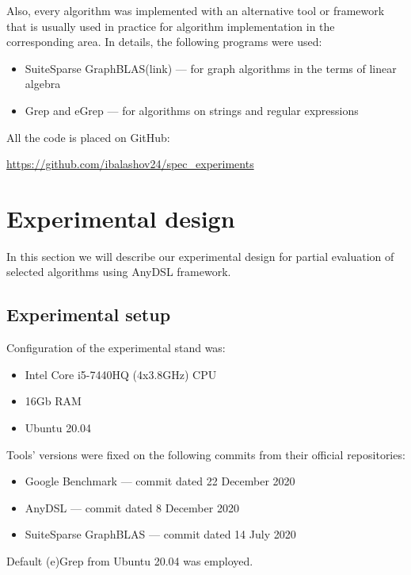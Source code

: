 \documentclass[conference]{IEEEtran}
\begin{document}
Also, every algorithm was implemented with an alternative tool or framework that is usually used in practice for algorithm implementation in the corresponding area. In details, the following programs were used:
\begin{itemize}
	\item SuiteSparse GraphBLAS(link) --- for graph algorithms in the terms of linear algebra
	\item Grep and eGrep --- for algorithms on strings and regular expressions
\end{itemize}


All the code is placed on GitHub:
\begin{center}
\href{https://github.com/ibalashov24/spec\_experiments}{https://github.com/ibalashov24/spec\_experiments}
\end{center}

\section{Experimental design}

In this section we will describe our experimental design for partial evaluation of selected algorithms using AnyDSL framework.

\subsection{Experimental setup}

Configuration of the experimental stand was:
\begin{itemize}
	\item Intel Core i5-7440HQ (4x3.8GHz) CPU
	\item 16Gb RAM
	\item Ubuntu 20.04
\end{itemize}

Tools' versions were fixed on the following commits from their official repositories:
\begin{itemize}
	\item Google Benchmark \cite{gbenchmark} --- commit dated 22 December 2020
	\item AnyDSL \cite{leissa2018anydsl} --- commit dated 8 December 2020
	\item SuiteSparse GraphBLAS \colorbox{red}{\cite{moreira2018implementing}} --- commit dated 14 July 2020
\end{itemize}

Default (e)Grep from Ubuntu 20.04 was employed.
\end{document}
